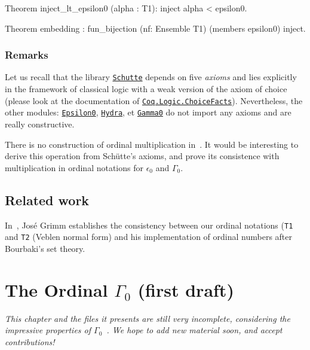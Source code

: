 {\begin{Coqsrc}
Theorem inject_lt_epsilon0 (alpha : T1):
      inject alpha < epsilon0.

Theorem embedding : 
     fun_bijection (nf: Ensemble T1)  (members epsilon0) inject.
 \end{Coqsrc}

\subsection{Remarks}
Let us recall that the library \href{../theories/html/hydras.Schutte.Schutte.html}%
{\texttt{Schutte}} depends on five \emph{axioms} and lies explicitly in the  
framework of classical logic with a weak version of the axiom of choice
(please look at the documentation of
\href{https://coq.inria.fr/distrib/current/stdlib/Coq.Logic.ChoiceFacts.html}{\texttt{Coq.Logic.ChoiceFacts}}).
Nevertheless, the other modules:
\href{../theories/html/hydras.Epsilon0.Epsilon0.html}%
{\texttt{Epsilon0}},
\href{../theories/html/hydras.Hydra.Hydra.html}%
{\texttt{Hydra}}, et 
\href{../theories/html/hydras.Gamma0.Gamma0.html}%
{\texttt{Gamma0}}
do not import any axioms and are really constructive.

\begin{project}
There is no construction of ordinal multiplication in~\cite{schutte}. 
It would be interesting to derive this operation from Schütte's axioms,
and prove its consistence with multiplication in ordinal notations for 
$\epsilon_0$ and $\Gamma_0$.
\end{project}

\section{Related work}

In~\cite{grimm:hal-00911710}, José Grimm establishes the consistency between our ordinal notations (\texttt{T1} and \texttt{T2} (Veblen normal form) and his implementation
of ordinal numbers after Bourbaki's set theory.


\chapter{The Ordinal \texorpdfstring{$\Gamma_0$}{Gamma0} (first draft)}


\emph{This chapter and the files it presents are still very incomplete, considering the impressive properties of $\Gamma_0$~\cite{Gallier91}.  We hope to add new material soon, and accept contributions!}


}
